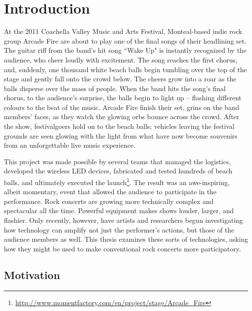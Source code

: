 \chapter{Introduction}

At the 2011 Coachella Valley Music and Arts Festival, Monteal-based indie rock group Arcade Fire are about to play one of the final songs of their headlining set. The guitar riff from the band's hit song ``Wake Up" is instantly recognized by the audience, who cheer loudly with excitement. The song reaches the first chorus, and, suddenly, one thousand white beach balls begin tumbling over the top of the stage and gently fall onto the crowd below. The cheers grow into a roar as the balls disperse over the mass of people. When the band hits the song's final chorus, to the audience's surprise, the balls begin to light up -- flashing different colours to the beat of the music. Arcade Fire finish their set, grins on the band members' faces, as they watch the glowing orbs bounce across the crowd. After the show, festivalgoers hold on to the beach balls; vehicles leaving the festival grounds are seen glowing with the light from what have now become souvenirs from an unforgettable live music experience.

This project was made possible by several teams that managed the logistics, developed the wireless LED devices, fabricated and tested hundreds of beach balls, and ultimately executed the launch\footnote{\url{http://www.momentfactory.com/en/project/stage/Arcade_Fire}}. The result was an awe-inspiring, albeit momentary, event that allowed the audience to participate in the performance. Rock concerts are growing more technically complex and spectacular all the time. Powerful equipment makes shows louder, larger, and flashier. Only recently, however, have artists and researchers begun investigating how technology can amplify not just the performer's actions, but those of the audience members as well. This thesis examines these sorts of technologies, asking how they might be used to make conventional rock concerts more participatory.

\setcounter{page}{2}

\section{Motivation}

